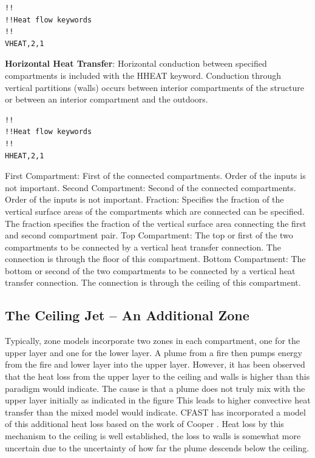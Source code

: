 \begin{lstlisting}
!!
!!Heat flow keywords
!!
VHEAT,2,1
\end{lstlisting}

\textbf{Horizontal Heat Transfer}: Horizontal conduction between specified compartments is included with the HHEAT keyword.  Conduction through vertical partitions (walls) occurs between interior compartments of the structure or between an interior compartment and the outdoors.

\begin{lstlisting}
!!
!!Heat flow keywords
!!
HHEAT,2,1
\end{lstlisting}
 
First Compartment: First of the connected compartments. Order of the inputs is not important.
Second Compartment: Second of the connected compartments. Order of the inputs is not important.
Fraction: Specifies the fraction of the vertical surface areas of the compartments which are connected can be specified. The fraction specifies the fraction of the vertical surface area connecting the first and second compartment pair.
Top Compartment: The top or first of the two compartments to be connected by a vertical heat transfer connection. The connection is through the floor of this compartment.
Bottom Compartment: The bottom or second of the two compartments to be connected by a vertical heat transfer connection. The connection is through the ceiling of this compartment.

\subsection{The Ceiling Jet – An Additional Zone}

Typically, zone models incorporate two zones in each compartment, one for the upper layer and one for the lower layer. A plume from a fire then pumps energy from the fire and lower layer into the upper layer. However, it has been observed that the heat loss from the upper layer to the ceiling and walls is higher than this paradigm would indicate. The cause is that a plume does not truly mix with the upper layer initially as indicated in the figure 
This leads to higher convective heat transfer than the mixed model would indicate. CFAST has incorporated a model of this additional heat loss based on the work of Cooper . Heat loss by this mechanism to the ceiling is well established, the loss to walls is somewhat more uncertain due to the uncertainty of how far the plume descends below the ceiling. 

